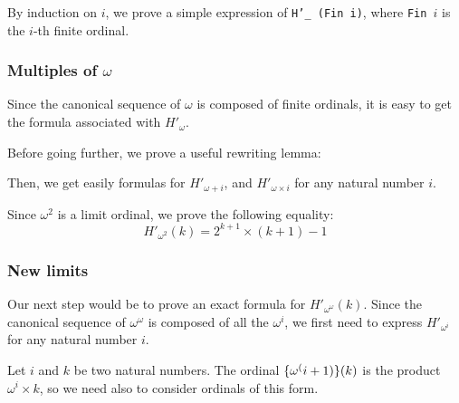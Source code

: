 By induction on $i$, we prove a simple expression of \texttt{H'\_ (Fin i)}, where 
\texttt{Fin $i$}  is the $i$-th finite ordinal.




\subsubsection{Multiples of \texorpdfstring{$\omega$}{omega}}

Since the canonical sequence of $\omega$ is composed of finite ordinals, 
it is easy to get the formula associated with $H'_\omega$.



Before going further, we prove a useful rewriting lemma:





Then, we get easily formulas for $H'_{\omega+i}$, and $H'_{\omega\times i}$ for any natural number $i$.








Since $\omega^2$ is a limit ordinal, we prove the following equality: 
\[H'_{\omega^2} (k) = 2 ^ {k+1} \times (k+1) - 1\]




\subsubsection{New limits}

Our next step would be to prove an exact formula for $H'_{\omega^\omega}(k)$.
Since the canonical sequence of $\omega^\omega$ is composed of all the
$\omega^i$, we first need to express $H'_{\omega^i}$ for any natural number $i$.

Let $i$ and $k$ be two natural numbers. 
The ordinal $\mbox{$\{\omega^(i+1)\}(k)$}$ is the product
$\omega^i \times k$, so we need also to consider ordinals of this form.

